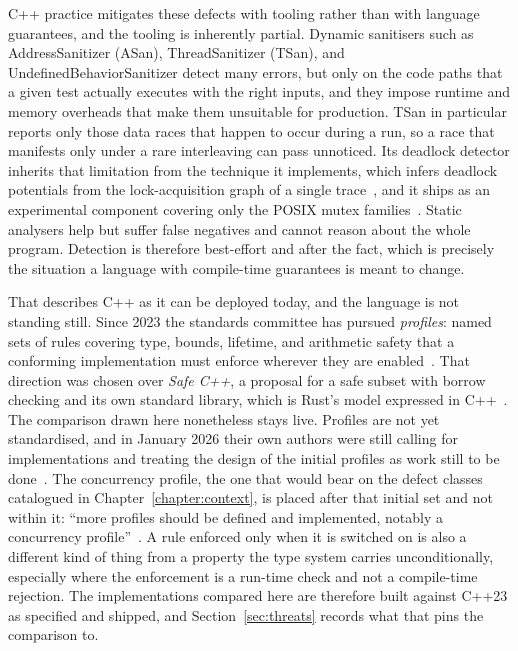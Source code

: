 \documentclass[english,oneside,a4paper,censored,csm,software-track-2020]{HYthesisML}
\begin{document}
C++ practice mitigates these defects with tooling rather than with language guarantees, and
the tooling is inherently partial. Dynamic sanitisers such as AddressSanitizer (ASan),
ThreadSanitizer (TSan), and UndefinedBehaviorSanitizer detect many errors, but only on the
code paths that a given test actually executes with the right inputs, and they impose runtime
and memory overheads that make them unsuitable for production. TSan in particular reports only
those data races that happen to occur during a run, so a race that manifests only under a rare
interleaving can pass unnoticed. Its deadlock detector inherits that limitation from the technique
it implements, which infers deadlock potentials from the lock-acquisition graph of a single
trace~\cite{bensalem2005deadlock}, and it ships as an experimental component covering only the
POSIX mutex families~\cite{tsandeadlock}. Static analysers help but suffer false negatives and cannot
reason about the whole program. Detection is therefore best-effort and after the fact, which
is precisely the situation a language with compile-time guarantees is meant to change.

That describes C++ as it can be deployed today, and the language is not standing still. Since
2023 the standards committee has pursued \emph{profiles}: named sets of rules covering type,
bounds, lifetime, and arithmetic safety that a conforming implementation must enforce wherever
they are enabled~\cite{sutter2025profiles}. That direction was chosen over \emph{Safe C++}, a
proposal for a safe subset with borrow checking and its own standard library, which is Rust's
model expressed in C++~\cite{baxter2024safecpp}. The comparison drawn here nonetheless stays
live. Profiles are not yet standardised, and in January 2026 their own authors were still
calling for implementations and treating the design of the initial profiles as work still to be
done~\cite{vandevoorde2026profiles}. The concurrency profile, the one that would bear on the
defect classes catalogued in Chapter~\ref{chapter:context}, is placed after that initial set and
not within it: ``more profiles should be defined and implemented, notably a concurrency
profile''~\cite{vandevoorde2026profiles}. A rule enforced only when it is switched on is also a
different kind of thing from a property the type system carries unconditionally, especially
where the enforcement is a run-time check and not a compile-time rejection. The implementations
compared here are therefore built against C++23 as specified and shipped, and
Section~\ref{sec:threats} records what that pins the comparison to.
\end{document}
